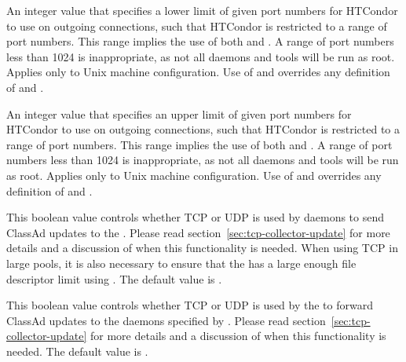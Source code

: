 \begin{description}
\label{param:OutLowPort}
\item[\Macro{OUT\_LOWPORT}]
  An integer value that specifies a lower limit of given port numbers
  for HTCondor to use on outgoing connections,
  such that HTCondor is restricted to a range of port numbers.
  This range implies the use of both  and
  .
  A range of port numbers less than 1024 is inappropriate, as
  not all daemons and tools will be run as root.
  Applies only to Unix machine configuration.
  Use of  and  overrides
  any definition of  and .

\label{param:OutHighPort}
\item[\Macro{OUT\_HIGHPORT}]
  An integer value that specifies an upper limit of given port numbers
  for HTCondor to use on outgoing connections,
  such that HTCondor is restricted to a range of port numbers.
  This range implies the use of both  and
  .
  A range of port numbers less than 1024 is inappropriate, as
  not all daemons and tools will be run as root.
  Applies only to Unix machine configuration.
  Use of  and  overrides
  any definition of  and .

\label{param:UpdateCollectorWithTcp}
\item[\Macro{UPDATE\_COLLECTOR\_WITH\_TCP}]
  This boolean value controls whether TCP or UDP is used by daemons to
  send ClassAd updates to the .
  Please read section~\ref{sec:tcp-collector-update} 
  for more details and a discussion of when this functionality is needed. 
  When using TCP in large pools, it is also necessary to
  ensure that the  has a large enough file descriptor limit
  using .
  The default value is .

\label{param:UpdateViewCollectorWithTcp}
\item[\Macro{UPDATE\_VIEW\_COLLECTOR\_WITH\_TCP}]
  This boolean value controls whether TCP or UDP is used by the
   to forward ClassAd updates to the 
  daemons specified by .
  Please read section~\ref{sec:tcp-collector-update} 
  for more details and a discussion of when this
  functionality is needed.
  The default value is .


\end{description}

